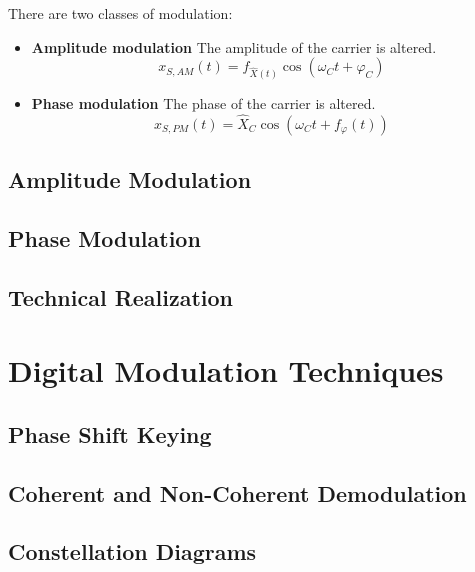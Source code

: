 \begin{refsection}
There are two classes of modulation:
\begin{itemize}
	\item \textbf{Amplitude modulation} The amplitude of the carrier is altered.
	\begin{equation}
		x_{S,AM}(t) = f_{\hat{X}(t)} \cos\left(\omega_C t + \varphi_C\right)
	\end{equation}
	\item \textbf{Phase modulation} The phase of the carrier is altered.
	\begin{equation}
		x_{S,PM}(t) = \hat{X}_C \cos\left(\omega_C t + f_{\varphi}(t)\right)
	\end{equation}
\end{itemize}

\subsection{Amplitude Modulation}

\subsection{Phase Modulation}

\subsection{Technical Realization}



\section{Digital Modulation Techniques}

\subsection{Phase Shift Keying}

\subsection{Coherent and Non-Coherent Demodulation}

\subsection{Constellation Diagrams}



\end{refsection}

